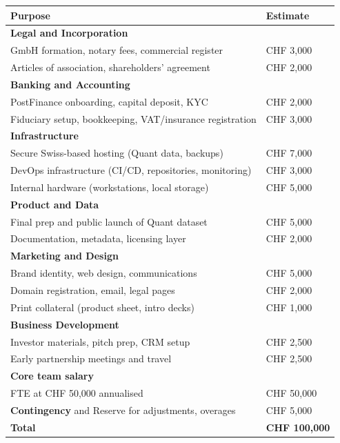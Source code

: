 \documentclass[preprint,12pt,fleqn]{article}
\begin{document}
\begin{tabular}{@{}lp{5cm}@{}}
\toprule
\textbf{Purpose} & \textbf{Estimate} \\
\midrule
\textbf{Legal and Incorporation} & \\
\quad GmbH formation, notary fees, commercial register & CHF 3,000 \\
\quad Articles of association, shareholders' agreement & CHF 2,000 \\

\textbf{Banking and Accounting} & \\
\quad PostFinance onboarding, capital deposit, KYC & CHF 2,000 \\
\quad Fiduciary setup, bookkeeping, VAT/insurance registration & CHF 3,000 \\

\textbf{Infrastructure} & \\
\quad Secure Swiss-based hosting (Quant data, backups) & CHF 7,000 \\
\quad DevOps infrastructure (CI/CD, repositories, monitoring) & CHF 3,000 \\
\quad Internal hardware (workstations, local storage) & CHF 5,000 \\

\textbf{Product and Data} & \\
\quad Final prep and public launch of Quant dataset & CHF 5,000 \\
\quad Documentation, metadata, licensing layer & CHF 2,000 \\

\textbf{Marketing and Design} & \\
\quad Brand identity, web design, communications & CHF 5,000 \\
\quad Domain registration, email, legal pages & CHF 2,000 \\
\quad Print collateral (product sheet, intro decks) & CHF 1,000 \\

\textbf{Business Development} & \\
\quad Investor materials, pitch prep, CRM setup & CHF 2,500 \\
\quad Early partnership meetings and travel & CHF 2,500 \\

\textbf{Core team salary} & \\
\quad  1.0 FTE at CHF 50,000 annualised & CHF 50,000 \\

\textbf{Contingency} and Reserve for adjustments, overages & CHF 5,000 \\

\midrule
\textbf{Total} & \textbf{CHF 100,000} \\
\bottomrule
\end{tabular}
\end{document}
